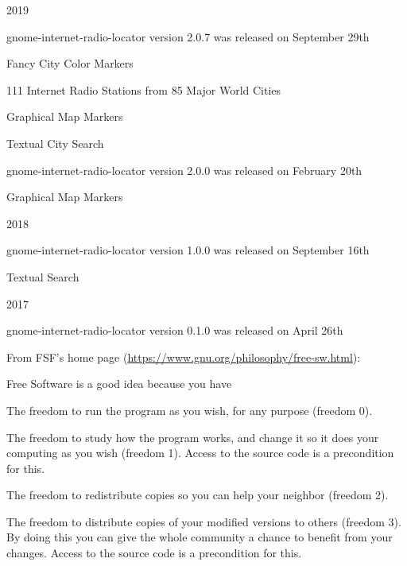 \documentclass[20pt,landscape]{foils}
\begin{document}
\begin{list1}
\item 2019
  \begin{list2}
  \item gnome-internet-radio-locator version 2.0.7 was released on September 29th
    \begin{list3}
    \item Fancy City Color Markers   
    \item 111 Internet Radio Stations from 85 Major World Cities
    \item Graphical Map Markers
    \item Textual City Search
    \end{list3}
  \end{list2}
  \begin{list3}
    \item gnome-internet-radio-locator version 2.0.0 was released on February 20th
      \begin{list3}
      \item Graphical Map Markers
      \end{list3}
  \end{list3}
\item 2018
  \begin{list2}
    \item gnome-internet-radio-locator version 1.0.0 was released on September 16th
    \begin{list3}
      \item Textual Search
    \end{list3}
  \end{list2}
\item 2017
  \begin{list2}
    \item gnome-internet-radio-locator version 0.1.0 was released on April 26th
  \end{list2}
\end{list1}


From FSF's home page (\url{https://www.gnu.org/philosophy/free-sw.html}):

\begin{list1}
\item Free Software is a good idea because you have
  \begin{list2}
    \item The freedom to run the program as you wish, for any purpose (freedom 0).
    \item The freedom to study how the program works, and change it so it does your computing as you wish (freedom 1). Access to the source code is a precondition for this.
    \item The freedom to redistribute copies so you can help your neighbor (freedom 2).
    \item The freedom to distribute copies of your modified versions to others (freedom 3). By doing this you can give the whole community a chance to benefit from your changes. Access to the source code is a precondition for this.
  \end{list2}
\end{list1}
\end{document}
